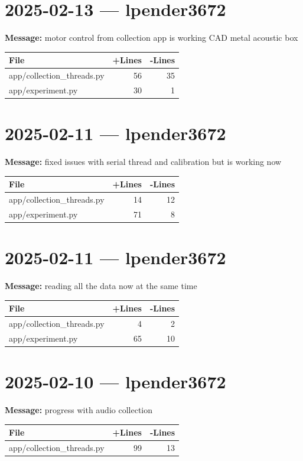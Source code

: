 \documentclass{article}
\begin{document}
\section*{2025-02-13 --- lpender3672}
\textbf{Message:} motor control from collection app is working CAD metal acoustic box

\begin{longtable}{|p{10cm}|r|r|}
\hline \textbf{File} & \textbf{+Lines} & \textbf{-Lines} \\
\hline
app/collection\_threads.py & 56 & 35 \\
\hline
app/experiment.py & 30 & 1 \\
\hline
\end{longtable}

\section*{2025-02-11 --- lpender3672}
\textbf{Message:} fixed issues with serial thread and calibration but is working now

\begin{longtable}{|p{10cm}|r|r|}
\hline \textbf{File} & \textbf{+Lines} & \textbf{-Lines} \\
\hline
app/collection\_threads.py & 14 & 12 \\
\hline
app/experiment.py & 71 & 8 \\
\hline
\end{longtable}

\section*{2025-02-11 --- lpender3672}
\textbf{Message:} reading all the data now at the same time

\begin{longtable}{|p{10cm}|r|r|}
\hline \textbf{File} & \textbf{+Lines} & \textbf{-Lines} \\
\hline
app/collection\_threads.py & 4 & 2 \\
\hline
app/experiment.py & 65 & 10 \\
\hline
\end{longtable}

\section*{2025-02-10 --- lpender3672}
\textbf{Message:} progress with audio collection

\begin{longtable}{|p{10cm}|r|r|}
\hline \textbf{File} & \textbf{+Lines} & \textbf{-Lines} \\
\hline
app/collection\_threads.py & 99 & 13 \\
\hline
\end{longtable}
\end{document}
